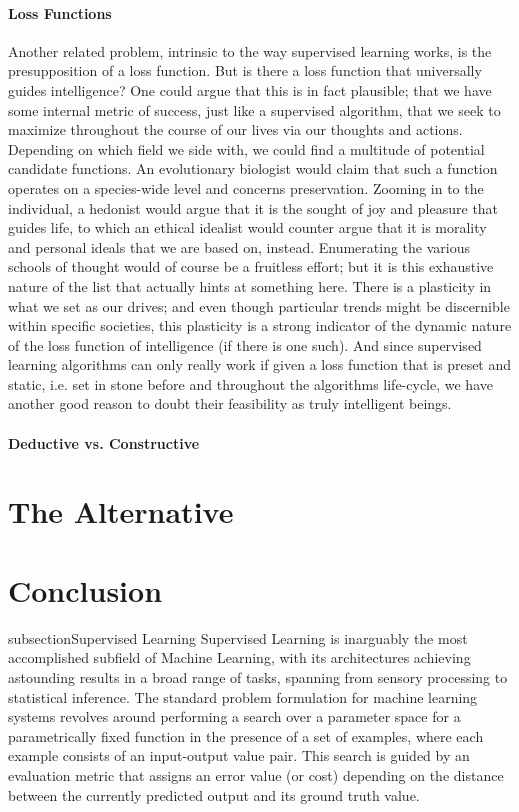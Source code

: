 \documentclass[]{article}
\begin{document}
\paragraph{Loss Functions}
Another related problem, intrinsic to the way supervised learning works, is the presupposition of a loss function. But is there a loss function that universally guides intelligence? One could argue that this is in fact plausible; that we have some internal metric of success, just like a supervised algorithm, that we seek to maximize throughout the course of our lives via our thoughts and actions. Depending on which field we side with, we could find a multitude of potential candidate functions. An evolutionary biologist would claim that such a function operates on a species-wide level and concerns preservation. Zooming in to the individual, a hedonist would argue that it is the sought of joy and pleasure that guides life, to which an ethical idealist would counter argue that it is morality and personal ideals that we are based on, instead. Enumerating the various schools of thought would of course be a fruitless effort; but it is this exhaustive nature of the list that actually hints at something here. There is a plasticity in what we set as our drives; and even though particular trends might be discernible within specific societies, this plasticity is a strong indicator of the dynamic nature of the loss function of intelligence (if there is one such). And since supervised learning algorithms can only really work if given a loss function that is preset and static, i.e. set in stone before and throughout the algorithms life-cycle, we have another good reason to doubt their feasibility as truly intelligent beings.

\paragraph{Deductive vs. Constructive}

\section{The Alternative}

\section{Conclusion}

subsection{Supervised Learning}
Supervised Learning is inarguably the most accomplished subfield of Machine Learning, with its architectures achieving astounding results in a broad range of tasks, spanning from sensory processing to statistical inference. The standard problem formulation for machine learning systems revolves around performing a search over a parameter space for a parametrically fixed function in the presence of a set of examples, where each example consists of an input-output value pair. This search is guided by an evaluation metric that assigns an error value (or cost) depending on the distance between the currently predicted output and its ground truth value.
\end{document}
